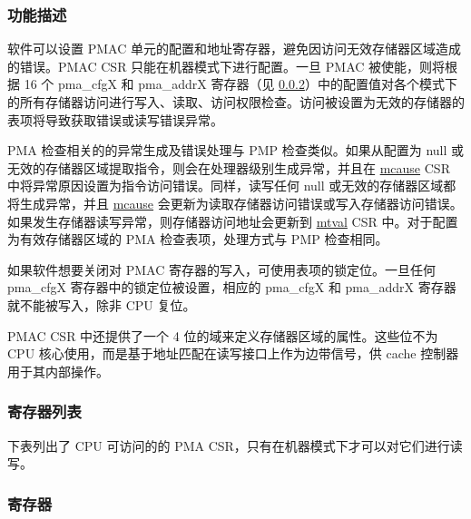 \documentclass[main\_\_CN.tex]{subfiles}
\begin{document}
\subsubsection{功能描述}
\label{sec:riscvcpu-pma-func-descr}

软件可以设置 PMAC 单元的配置和地址寄存器，避免因访问无效存储器区域造成的错误。PMAC CSR 只能在机器模式下进行配置。一旦 PMAC 被使能，则将根据 16 个 pma\_cfgX 和 pma\_addrX 寄存器（见 \ref{sec:riscvcpu-pma-reg-summ}）中的配置值对各个模式下的所有存储器访问进行写入、读取、访问权限检查。访问被设置为无效的存储器的表项将导致获取错误或读写错误异常。

PMA 检查相关的的异常生成及错误处理与 PMP 检查类似。如果从配置为 null 或无效的存储器区域提取指令，则会在处理器级别生成异常，并且在 \hyperref[regdesc:MCAUSE]{mcause} CSR 中将异常原因设置为指令访问错误。同样，读写任何 null 或无效的存储器区域都将生成异常，并且 \hyperref[regdesc:MCAUSE]{mcause} 会更新为读取存储器访问错误或写入存储器访问错误。如果发生存储器读写异常，则存储器访问地址会更新到 \hyperref[regdesc:MTVAL]{mtval} CSR 中。对于配置为有效存储器区域的 PMA 检查表项，处理方式与 PMP 检查相同。

如果软件想要关闭对 PMAC 寄存器的写入，可使用表项的锁定位。一旦任何 pma\_cfgX 寄存器中的锁定位被设置，相应的 pma\_cfgX 和 pma\_addrX 寄存器就不能被写入，除非 CPU 复位。

PMAC CSR 中还提供了一个 4 位的域来定义存储器区域的属性。这些位不为 CPU 核心使用，而是基于地址匹配在读写接口上作为边带信号，供 cache 控制器用于其内部操作。


\newpage
\hypertarget{riscvcpu-pma-reg-summ}{}
\subsubsection{寄存器列表}
\label{sec:riscvcpu-pma-reg-summ}

下表列出了 CPU 可访问的的 PMA CSR，只有在机器模式下才可以对它们进行读写。




\subsubsection{寄存器}
\label{sec:riscvcpu-pma-reg-desc}


\end{document}
